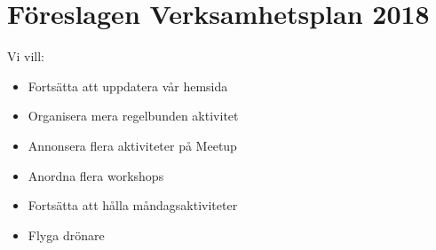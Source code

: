 \documentclass[a4paper,11pt,oneside]{article}
\begin{document}
\section*{Föreslagen Verksamhetsplan 2018}

Vi vill: \\
\begin{itemize}
\item Fortsätta att uppdatera vår hemsida
\item Organisera mera regelbunden aktivitet
\item Annonsera flera aktiviteter på Meetup
\item Anordna flera workshops
\item Fortsätta att hålla måndagsaktiviteter
\item Flyga drönare
\end{itemize}
\end{document}
